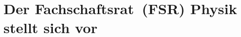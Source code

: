\newcommand{\fibelvorstellung}[2]{%
	\begin{minipage}{\columnwidth}
		\setlength{\intextsep}{0cm}
		\setlength{\parskip}{0.5ex}
		#1
		#2
		\vspace{0.5ex}
	\end{minipage}
	
	\vspace{5ex plus 2ex minus 1ex}
}
\newlength{\fibelstdlen}
\setlength{\fibelstdlen}{3.7cm}

\section{Der Fachschaftsrat~(FSR) Physik stellt sich vor}

